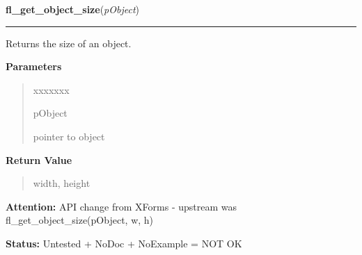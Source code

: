 \hspace{.8\funcindent}\begin{boxedminipage}{\funcwidth}

    \raggedright \textbf{fl\_get\_object\_size}(\textit{pObject})

    \vspace{-1.5ex}

    \rule{\textwidth}{0.5\fboxrule}
\setlength{\parskip}{2ex}
    Returns the size of an object.

\setlength{\parskip}{1ex}
      \textbf{Parameters}
      \vspace{-1ex}

      \begin{quote}
        \begin{Ventry}{xxxxxxx}

          \item[pObject]

          pointer to object

        \end{Ventry}

      \end{quote}

      \textbf{Return Value}
    \vspace{-1ex}

      \begin{quote}
      width, height

      \end{quote}

\textbf{Attention:} API change from XForms - upstream was fl\_get\_object\_size(pObject, w, h)



\textbf{Status:} Untested + NoDoc + NoExample = NOT OK



    \end{boxedminipage}

    \label{xformslib:library:fl_set_object_size}

    \vspace{0.5ex}


